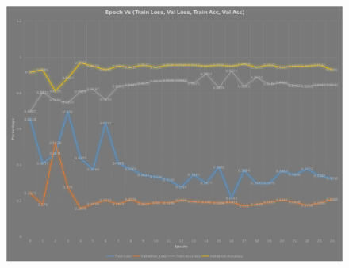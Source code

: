 \documentclass[12pt]{article}
\begin{document}
			\begin{figure}[h]
				\centering
				\includegraphics[width=13cm]{Plot_2.png}
				\label{fig:sub1}
			\end{figure}
		
\end{document}

